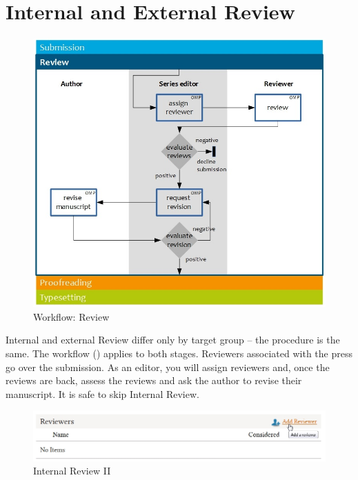 
\section{Internal and External Review} 

\begin{figure}[h] \centering
\includegraphics[width=1\textwidth]{./img/workflow_review.jpg} \caption{Workflow:  Review}
\label{fig:review}
\end{figure}

Internal and external Review differ only by target group -- the procedure is the same. The workflow () applies to both stages. Reviewers associated with the press go over the submission. As an editor, you will assign reviewers and, once the reviews are back, assess the reviews and ask the author to revise their manuscript. It is safe to skip Internal Review. 

\begin{figure}[h] \centering
\includegraphics[width=1\textwidth]{./img/addReviewer.jpg} \caption{Internal Review II}
\label{fig:addReviewer}
\end{figure}


